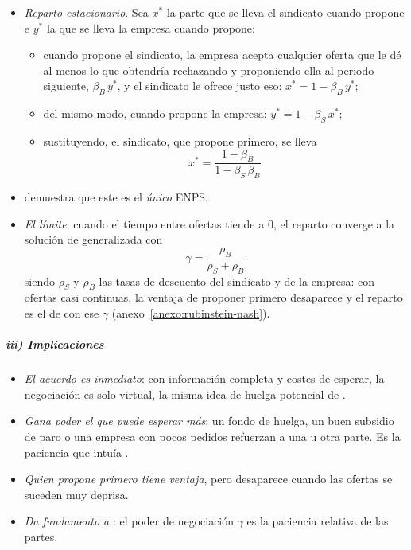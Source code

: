 \documentclass[11pt]{article}
\begin{document}
\begin{itemize}
\item \emph{Reparto estacionario}. Sea $x^*$ la parte que se lleva el sindicato cuando propone e $y^*$ la que se lleva la empresa cuando propone:
  \begin{itemize}
  \item cuando propone el sindicato, la empresa acepta cualquier oferta que le dé al menos lo que obtendría rechazando y proponiendo ella al periodo siguiente, $\beta_B\,y^*$, y el sindicato le ofrece justo eso: $x^*=1-\beta_B\,y^*$;
  \item del mismo modo, cuando propone la empresa: $y^*=1-\beta_S\,x^*$;
  \item sustituyendo, el sindicato, que propone primero, se lleva
    \begin{equation}
    x^*=\frac{1-\beta_B}{1-\beta_S\,\beta_B} \label{eq:rubinstein}
    \end{equation}
  \end{itemize}
\item \textcite{Rubinstein1982Perfect} demuestra que este es el \emph{único} ENPS.
\item \emph{El límite}: cuando el tiempo entre ofertas tiende a 0, el reparto converge a la solución de  generalizada\nocite{BinmoreRubinsteinWolinsky1986Nash} con
  \begin{equation}
  \gamma=\frac{\rho_B}{\rho_S+\rho_B} \label{eq:gamma-paciencia}
  \end{equation}
  siendo $\rho_S$ y $\rho_B$ las tasas de descuento del sindicato y de la empresa: con ofertas casi continuas, la ventaja de proponer primero desaparece y el reparto es el de  con ese $\gamma$ (anexo~\ref{anexo:rubinstein-nash}).
\end{itemize}

\subparagraph{iii) Implicaciones}

\begin{itemize}
\item \emph{El acuerdo es inmediato}: con información completa y costes de esperar, la negociación es solo virtual, la misma idea de huelga potencial de .
\item \emph{Gana poder el que puede esperar más}: un fondo de huelga, un buen subsidio de paro o una empresa con pocos pedidos refuerzan a una u otra parte. Es la paciencia que intuía .
\item \emph{Quien propone primero tiene ventaja}, pero desaparece cuando las ofertas se suceden muy deprisa.
\item \emph{Da fundamento a }: el poder de negociación $\gamma$ es la paciencia relativa de las partes.
\end{itemize}
\end{document}
